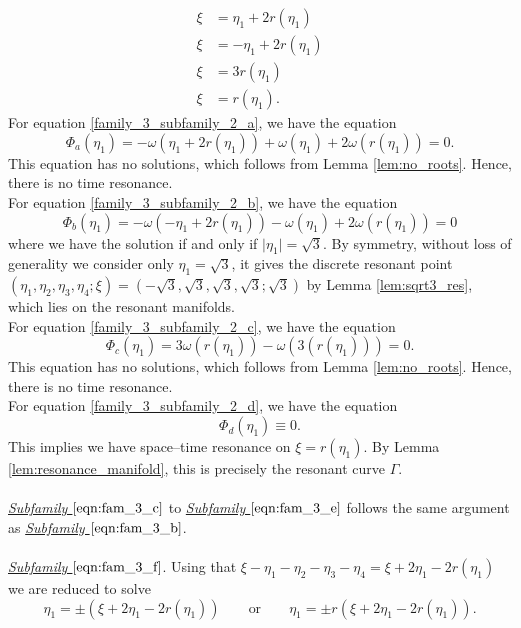 \documentclass[reqno,english,11pt]{amsart}
\theoremstyle{definition}
\numberwithin{equation}{section}
\begin{document}
\begin{subequations}
    \begin{align}
         \xi&=\eta_1+2r(\eta_1) \tag{a} \label{family_3_subfamily_2_a}
  \\
  \xi&=-\eta_1+2r(\eta_1) \tag{b} \label{family_3_subfamily_2_b}
 \\
  \xi&=3r(\eta_1) \tag{c} \label{family_3_subfamily_2_c}
 \\
   \xi&= r(\eta_1). \tag{d} \label{family_3_subfamily_2_d}
    \end{align} 
\end{subequations}
For equation \eqref{family_3_subfamily_2_a}, we have the equation
$$\Phi_a(\eta_1)=-\omega(\eta_1+2r(\eta_1))+\omega(\eta_1)+2\omega(r(\eta_1))=0.$$
This equation has no solutions, which follows from Lemma \ref{lem:no_roots}. 
Hence, there is no time resonance.\\
\noindent
For equation \eqref{family_3_subfamily_2_b}, we have the equation
$$\Phi_b(\eta_1)=-\omega(-\eta_1+2r(\eta_1))-\omega(\eta_1)+2\omega(r(\eta_1))=0$$
where we have the solution if and only if $\vert \eta_1\vert=\sqrt{3}$. By symmetry, without loss of generality we consider only $\eta_1=\sqrt{3}$, it gives the discrete resonant point $(\eta_1,\eta_2,\eta_3,\eta_4;\xi)=(-\sqrt{3},\sqrt{3},\sqrt{3},\sqrt{3};\sqrt{3})$  by Lemma \ref{lem:sqrt3_res}, which lies on the resonant manifolds.\\
\noindent
For equation \eqref{family_3_subfamily_2_c}, we have the equation
$$\Phi_c(\eta_1)=3\omega(r(\eta_1))-\omega(3(r(\eta_1)))=0.$$
This equation has no solutions, which follows from Lemma \ref{lem:no_roots}. Hence, there is no time resonance.
\\
\noindent
For equation \eqref{family_3_subfamily_2_d}, we have the equation
$$\Phi_d(\eta_1)\equiv 0.$$
This implies we have space--time resonance on $\xi=r(\eta_1)$. By Lemma \ref{lem:resonance_manifold}, this is precisely the resonant curve $\Gamma$.
\\\\
\noindent
{\it \underline{Subfamily $\eqref{eqn:fam_3_c}$}} to 
{\it \underline{Subfamily $\eqref{eqn:fam_3_e}$}} follows the same argument as {\it \underline{Subfamily $\eqref{eqn:fam_3_b}$}}. 
\\\\
\noindent
{\it \underline{Subfamily $\eqref{eqn:fam_3_f}$}}.
Using that $\xi-\eta_1-\eta_2-\eta_3-\eta_4=\xi+2\eta_1-2r(\eta_1)$ we are reduced to solve
$$\eta_1=\pm\left(\xi+2\eta_1-2r(\eta_1)\right)\qquad \text{or}\qquad \eta_1=\pm r(\xi+2\eta_1-2r(\eta_1)).$$
\end{document}
